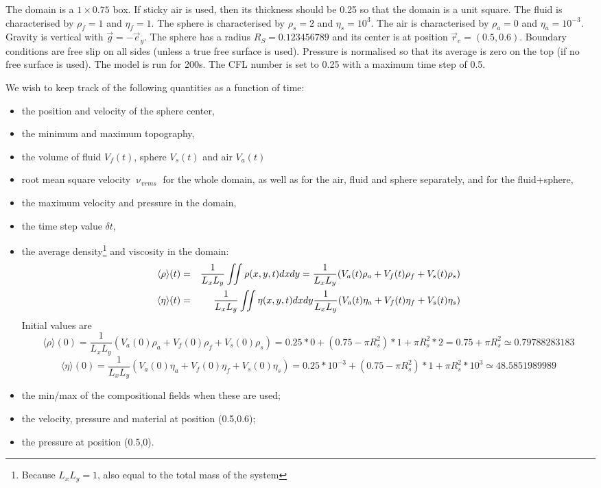 
The domain is a $1\times 0.75$ box. If sticky air is used, then its thickness should be 0.25 so that the
domain is a unit square. 
The fluid is characterised by $\rho_f=1$ and $\eta_f=1$. The sphere is characterised by $\rho_s=2$ and
$\eta_s=10^3$. The air is characterised by $\rho_a=0$ and $\eta_a=10^{-3}$. Gravity is 
vertical with $\vec{g}=-\vec{e}_y$.
The sphere has a radius $R_S=0.123456789$ and its center is at position $\vec{r}_c=(0.5,0.6)$. 
Boundary conditions are free slip on all sides (unless a true free surface is used).
Pressure is normalised so that its average is zero on the top (if no free surface is used).
The model is run for 200s. The CFL number is set to 0.25 with a maximum time step of 0.5. 

We wish to keep track of the following quantities as a function of time:
\begin{itemize}
\item the position and velocity of the sphere center,
\item the minimum and maximum topography,
\item the volume of fluid $V_f(t)$, sphere $V_s(t)$ and air $V_a(t)$
\item root mean square velocity $\upnu_{vrms}$ for the whole domain, as well as for the air, fluid and sphere 
      separately, and for the fluid+sphere,
\item the maximum velocity and pressure in the domain,
\item the time step value $\delta t$,
\item the average density\footnote{Because $L_xL_y=1$, also equal to the total mass of the system} and viscosity in the domain:
\begin{eqnarray}
\langle \rho \rangle (t) &=& \frac{1}{L_xL_y} \iint \rho(x,y,t) dx dy
= \frac{1}{L_xL_y} ( V_a(t)\rho_a + V_f(t)\rho_f + V_s(t)\rho_s )  \nonumber\\
\langle \eta \rangle (t) &=& \frac{1}{L_xL_y} \iint \eta(x,y,t) dx dy
\frac{1}{L_xL_y} ( V_a(t) \eta_a + V_f(t)\eta_f  + V_s(t)\eta_s ) 
\end{eqnarray}
Initial values are 
\[
\langle \rho \rangle (0) = \frac{1}{L_xL_y} ( V_a(0)\rho_a + V_f(0)\rho_f + V_s(0)\rho_s )  
= 0.25*0 + (0.75-\pi R_s^2)*1 + \pi R_s^2* 2 = 0.75 + \pi R_s^2  \simeq 0.79788283183
\]
\[
\langle \eta \rangle (0) = \frac{1}{L_xL_y} ( V_a(0)\eta_a + V_f(0)\eta_f + V_s(0)\eta_s )  
= 0.25*10^{-3} + (0.75-\pi R_s^2)*1 + \pi R_s^2* 10^3   \simeq 48.5851989989
\]



\item the min/max of the compositional fields when these are used;
\item the velocity, pressure and material at position (0.5,0.6);
\item the pressure at position (0.5,0).
\end{itemize}

